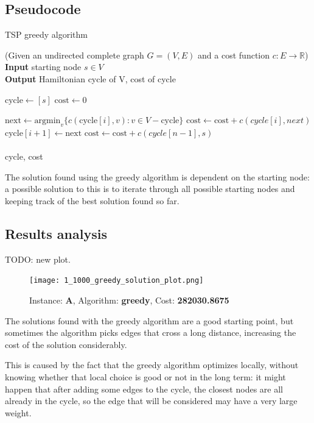 \subsection{Pseudocode}
\begin{algorithm}[h]
    \caption{TSP greedy algorithm}
    (Given an undirected complete graph $G=(V,E)$ and a cost function $c:E\rightarrow\mathbb{R}$)\\

    \textbf{Input} starting node $s\in V$\\
    \textbf{Output} Hamiltonian cycle of V, cost of cycle\\
    \begin{algorithmic}

        \State $\mbox{cycle} \gets [s]$
        \State $\mbox{cost} \gets 0$
        
            \State $\mbox{next}\gets\mbox{argmin}_v\{c(\mbox{cycle}[i],v) : v\in V - \mbox{cycle}\}$
            \State $\mbox{cost}\gets\mbox{cost}+c(cycle[i], next)$
            \State $\mbox{cycle}[i+1]\gets\mbox{next}$
        \EndFor
        \State $\mbox{cost}\gets\mbox{cost}+c(cycle[n-1],s)$\\\\
        \Return cycle, cost
    \end{algorithmic}
\end{algorithm}
\FloatBarrier

The solution found using the greedy algorithm is dependent on the starting node: a possible solution to this is to iterate through all possible starting nodes and keeping track of the best solution found so far.

\subsection{Results analysis}
TODO: new plot.
\begin{figure}[h]
    \centering
    \texttt{[image: 1\_1000\_greedy\_solution\_plot.png]}
    \caption*{Instance: \textbf{A}, Algorithm: \textbf{greedy}, Cost: \textbf{282030.8675}}
\end{figure}

The solutions found with the greedy algorithm are a good starting point, but sometimes the algorithm picks edges that cross a long distance, increasing the cost of the solution considerably.

This is caused by the fact that the greedy algorithm optimizes locally, without knowing whether that local choice is good or not in the long term: it might happen that after adding some edges to the cycle, the closest nodes are all already in the cycle, so the edge that will be considered may have a very large weight.

